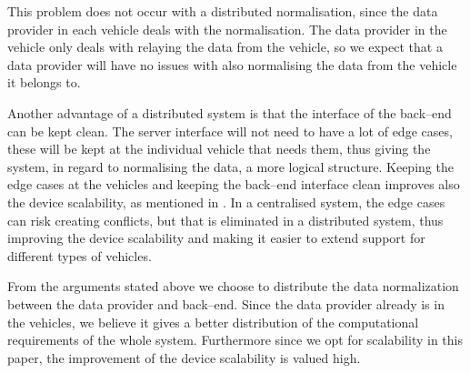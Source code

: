 This problem does not occur with a distributed normalisation, since the data provider in each vehicle deals with the normalisation.
The data provider in the vehicle only deals with relaying the data from the vehicle, 
so we expect that a data provider will have no issues with also normalising the data from the vehicle it belongs to.

Another advantage of a distributed system is that the interface of the back--end can be kept clean.
The server interface will not need to have a lot of edge cases, 
these will be kept at the individual vehicle that needs them, 
thus giving the system, in regard to normalising the data, a more logical structure.
Keeping the edge cases at the vehicles and keeping the back--end interface clean improves also the device scalability, 
as mentioned in .
In a centralised system, the edge cases can risk creating conflicts, but that is eliminated in a distributed system,
thus improving the device scalability and making it easier to extend support for different types of vehicles.

\bigskip

From the arguments stated above we choose to distribute the data normalization between the data provider and back--end.
Since the data provider already is in the vehicles, 
we believe it gives a better distribution of the computational requirements of the whole system.
Furthermore since we opt for scalability in this paper, the improvement of the device scalability is valued high.
